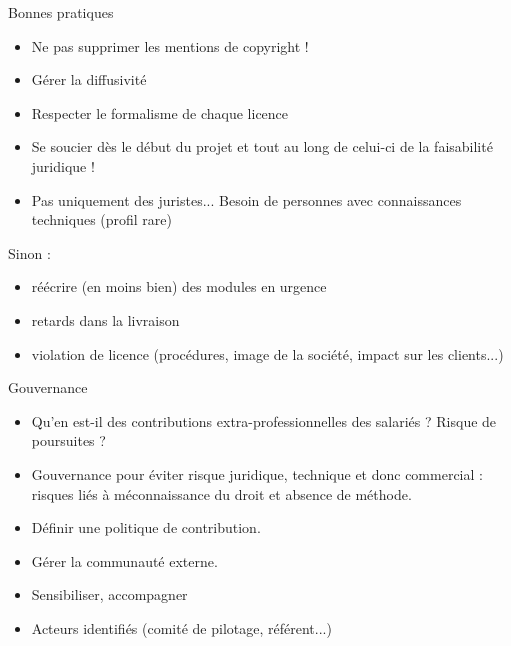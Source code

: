 \documentclass{beamer}
\begin{document}
\begin{frame}{Bonnes pratiques}
  \begin{itemize}
  \item Ne pas supprimer les mentions de copyright !
  \item Gérer la diffusivité
  \item Respecter le formalisme de chaque licence
  \item Se soucier dès le début du projet et tout au long de celui-ci de la faisabilité juridique !
  \item Pas uniquement des juristes... Besoin de personnes avec connaissances techniques (profil rare)
  \end{itemize}
Sinon :
\begin{itemize}
\item réécrire (en moins bien) des modules en urgence
\item retards dans la livraison
\item violation de licence (procédures, image de la société, impact sur les clients...)
\end{itemize}
\end{frame}

\begin{frame}{Gouvernance}

  \begin{itemize}
  \item Qu'en est-il des contributions extra-professionnelles des salariés ? Risque de poursuites ?
  \item Gouvernance pour éviter risque juridique, technique et donc commercial : risques liés à méconnaissance du droit et absence de méthode.
  \item Définir une politique de contribution.
  \item Gérer la communauté externe.
  \item Sensibiliser, accompagner
  \item Acteurs identifiés (comité de pilotage, référent...)
  \end{itemize}
  
\end{frame}
\end{document}
